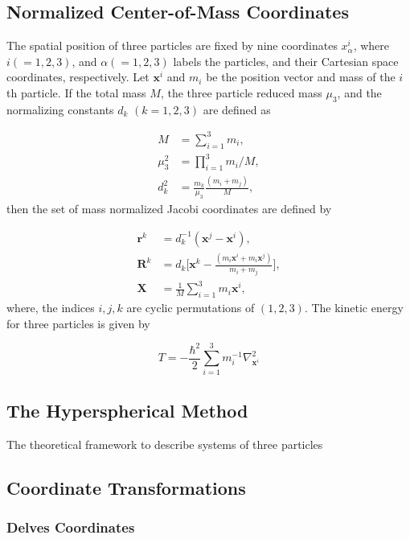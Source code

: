 \documentclass{article}
\begin{document}
\subsection{Normalized Center-of-Mass Coordinates}
The spatial position of three particles are fixed by nine coordinates $x_{\alpha}^{i}$, where $i(=1,2,3)$, and $\alpha(=1,2,3)$ labels the particles, and their Cartesian space coordinates, respectively. Let $\mathbf{x}^i$ and $m_{i}$ be the position vector and mass of the $i$th particle. If the total mass $M$, the three particle reduced mass $\mu_{3}$, and the normalizing constants $d_{k}$ $(k=1,2,3)$ are defined as

\begin{align}
M &= \sum_{i=1}^{3}m_i,\\
\mu_3^2 &= \prod_{i=1}^{3}m_i/M,\\
d_k^2 &= \frac{m_k}{\mu_3}\frac{(m_i+m_j)}{M}, 
\end{align}
then the set of mass normalized Jacobi coordinates are defined by

\begin{align}
\mathbf{r}^k &= d^{-1}_k(\mathbf{x}^{j}-\mathbf{x}^{i}),\\
\mathbf{R}^k &= d_k\Big[\mathbf{x}^{k}-\frac{(m_{i}\mathbf{x}^{i}+m_{i}\mathbf{x}^{j})}{m_{i}+m_{j}}\Big],\\
\mathbf{X} &= \frac{1}{M} \sum_{i=1}^{3} m_{i} \mathbf{x}^{i},
\end{align}   
where, the indices $i,j,k$ are cyclic permutations of $(1,2,3)$. The kinetic energy for three particles is given by

\begin{equation}
T = -\frac{\hbar^2}{2} \sum_{i=1}^{3} m_{i}^{-1} \nabla^{2}_{\mathbf{x}^{i}}
\end{equation}

\subsection{The Hyperspherical Method}

The theoretical framework to describe systems of three particles 

\subsection{Coordinate Transformations}
\subsubsection{Delves Coordinates}
\end{document}

